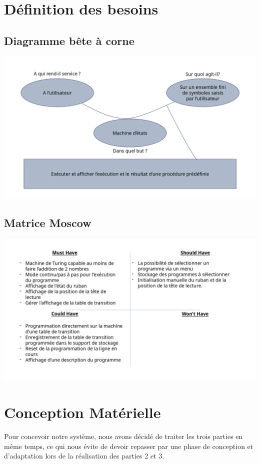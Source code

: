 \documentclass[12pt]{report}
\begin{document}
 	\section{Définition des besoins}
 	 \subsection{Diagramme bête à corne}
 	 \includegraphics[width=\textwidth]{img/bete_a_corne}
 	 \subsection{Matrice Moscow}
 	 \includegraphics[width=\textwidth]{img/moscow}
	 \section{Conception Matérielle}
	 Pour concevoir notre système, nous avons décidé de traiter les trois parties en même temps, ce qui nous évite de devoir repasser par une phase de conception et d'adaptation lors de la réalisation des parties 2 et 3.\\
\end{document}
